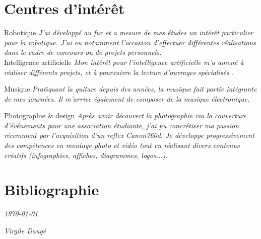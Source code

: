 \documentclass[]{friggeri-cv}
\begin{document}
\section{Centres d’intérêt}
\begin{entrylist}
  \entry
    {}
    {Robotique}
    {}
    {\emph{J'ai développé au fur et a mesure de mes études un intérêt particulier pour la robotique. J'ai eu notamment l'occasion d'effectuer différentes réalisations dans le cadre de concours ou de projets personnels.\\}}
    \entry
    {}
    {Intelligence artificielle}
    {}
    {\emph{Mon intérêt pour l'intelligence artificielle m'a amené à réaliser différents projets, et à poursuivre la lecture d'ouvrages spécialisés \cite{IAProg}\cite{IABase}.\\}}
    
    \entry
    {}
    {Musique}
    {}
    {\emph{Pratiquant la guitare depuis des années, la musique fait partie intégrante de mes journées. Il m'arrive également de composer de la musique électronique.\\}}
    
    \entry
    {}
    {Photographie \& design}
    {}
    {\emph{Après avoir découvert la photographie via la couverture d'événements pour une association étudiante, j'ai pu concrétiser ma passion récemment par l'acquisition d'un reflex Canon760d. Je développe progressivement des compétences en montage photo et vidéo tout en réalisant divers contenus créatifs (infographies, affiches, diagrammes, logos...).\\}}
    
    
\end{entrylist}

\section{Bibliographie}
\printbibliography[heading=none]

\begin{flushleft}
\emph{\today}
\end{flushleft}
\begin{flushright}
\emph{Virgile Daugé}
\end{flushright}
\end{document}

